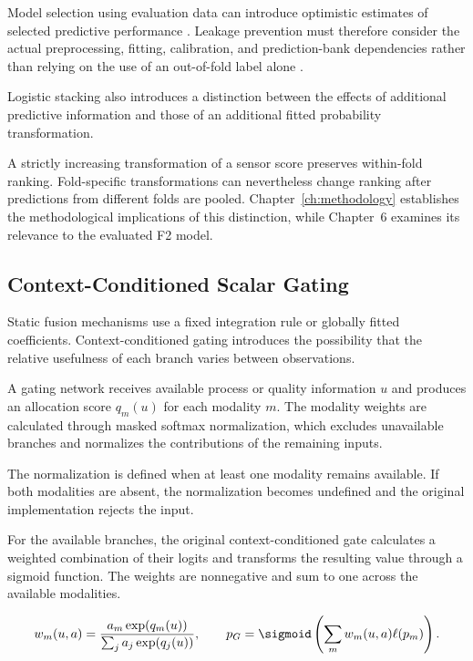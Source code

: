 Model selection using evaluation data can introduce optimistic estimates of selected predictive performance \parencite{P004}. Leakage prevention must therefore consider the actual preprocessing, fitting, calibration, and prediction-bank dependencies rather than relying on the use of an out-of-fold label alone \parencite{P017}.

Logistic stacking also introduces a distinction between the effects of additional predictive information and those of an additional fitted probability transformation.

A strictly increasing transformation of a sensor score preserves within-fold ranking. Fold-specific transformations can nevertheless change ranking after predictions from different folds are pooled. Chapter~\ref{ch:methodology} establishes the methodological implications of this distinction, while Chapter~6 examines its relevance to the evaluated F2 model.

\subsection{Context-Conditioned Scalar Gating}

Static fusion mechanisms use a fixed integration rule or globally fitted coefficients. Context-conditioned gating introduces the possibility that the relative usefulness of each branch varies between observations.

A gating network receives available process or quality information \(u\) and produces an allocation score \(q_m(u)\) for each modality \(m\). The modality weights are calculated through masked softmax normalization, which excludes unavailable branches and normalizes the contributions of the remaining inputs.

The normalization is defined when at least one modality remains available. If both modalities are absent, the normalization becomes undefined and the original implementation rejects the input.

For the available branches, the original context-conditioned gate calculates a weighted combination of their logits and transforms the resulting value through a sigmoid function. The weights are nonnegative and sum to one across the available modalities.

\begin{equation}
 w_m(u,a)=\frac{a_m\exp(q_m(u))}{\sum_j a_j\exp(q_j(u))},\qquad
 p_G=\sigmoid\left(\sum_m w_m(u,a)\ell(p_m)\right).
 \label{eq:gate}
\end{equation}

